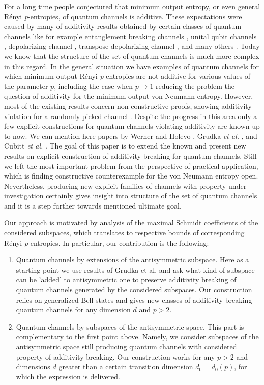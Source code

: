\documentclass[reqno]{amsart}
\theoremstyle{plain}
\theoremstyle{note}
\begin{document}
For a long time people conjectured that minimum output entropy, or even general R\'{e}nyi \textit{p}-entropies, of quantum channels is additive. These expectations were caused by many of additivity results obtained by certain classes of quantum channels like for example entanglement breaking channels \cite{doi:10.1063/1.1498000}, unital qubit channels \cite{doi:10.1063/1.1500791}, depolarizing channel \cite{1159773}, transpose depolarizing channel \cite{doi:10.1142/S0219749906001633}, and many others \cite{Matsumoto_2004,Alicki2004,Datta_2005,Wolf_2005}. Today we know that the structure of the set of quantum channels is much more complex in this regard. In the general situation we have examples of quantum channels for which minimum output R\'{e}nyi \textit{p}-entropies are not additive for various values of the parameter $p$, including the case when $p\rightarrow 1$ \cite{Hastings2009} reducing the problem the question of additivity for the minimum output von Neumann entropy. However, most of the existing results concern non-constructive proofs, showing additivity violation for a randomly picked channel \cite{Hayden2008,Hastings2009}. Despite the progress in this area only a few explicit constructions for quantum channels violating additivity are known up to now. We can mention here papers by Werner and Holevo \cite{doi:10.1063/1.1498491}, Grudka \textit{et al.} \cite{Grudka_2010}, and Cubitt \textit{et al.} \cite{Cubitt2008}.
The goal of this paper is to extend the known and present new results on explicit construction of additivity breaking for quantum channels. Still we left the most important problem from the perspective of practical application, which is finding constructive counterexample for the von Neumann entropy open. Nevertheless, producing new explicit families of channels with property under investigation certainly gives insight into structure of the set of quantum channels and it is a step further towards mentioned ultimate goal. 

Our approach is motivated by analysis of the maximal Schmidt coefficients of the considered subspaces, which translates to respective bounds of corresponding R\'{e}nyi \textit{p}-entropies. In particular, our contribution is the following:
\begin{enumerate}
    \item Quantum channels by extensions of the antisymmetric subspace. Here as a starting point we use results of Grudka et al. \cite{Grudka_2010} and ask what kind of subspace can be 'added' to antisymmetric one to preserve additivity breaking of quantum channels generated by the considered subspaces. Our construction relies on generalized Bell states \cite{Sych_2009} and gives new classes of additivity breaking quantum channels for any dimension $d$ and $p>2$.
    \item Quantum channels by subspaces of the antisymmetric space. This part is complementary to the first point above. Namely, we consider subspaces of the antisymmetric space still producing quantum channels with considered property of additivity breaking. Our construction works for any $p>2$ and dimensions $d$ greater than a certain transition dimension $d_0=d_0(p)$, for which the expression is delivered.
\end{enumerate}
\end{document}
